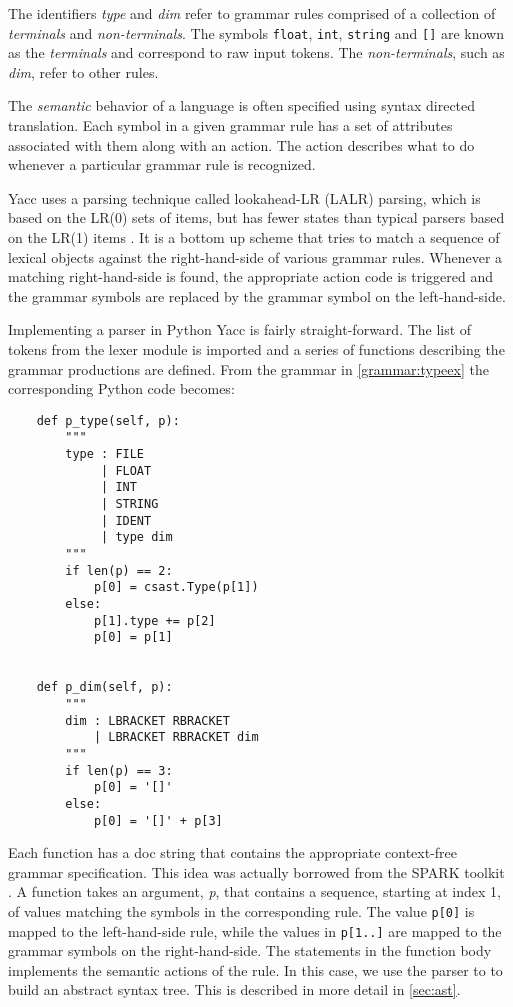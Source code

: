 \noindent The identifiers \emph{type} and \emph{dim} refer to grammar
rules comprised of a collection of \emph{terminals} and
\emph{non-terminals}. The symbols \texttt{float}, \texttt{int},
\texttt{string} and \texttt{[]} are known as the \emph{terminals}
and correspond to raw input tokens. The \emph{non-terminals}, such as
\emph{dim}, refer to other rules.

The \emph{semantic} behavior of a language is often specified using
syntax directed translation. Each symbol in a given grammar rule has a
set of attributes associated with them along with an action. The
action describes what to do whenever a particular grammar rule is
recognized.

Yacc uses a parsing technique called lookahead-LR (LALR) parsing,
which is based on the LR(0) sets of items, but has fewer states than
typical parsers based on the LR(1) items \citep{aho:2007}. It is a
bottom up scheme that tries to match a sequence of lexical objects
against the right-hand-side of various grammar rules. Whenever a
matching right-hand-side is found, the appropriate action code is
triggered and the grammar symbols are replaced by the grammar symbol
on the left-hand-side.

Implementing a parser in Python Yacc is fairly straight-forward. The
list of tokens from the lexer module is imported and a series of
functions describing the grammar productions are defined. From the
grammar in \autoref{grammar:typeex} the corresponding Python code
becomes:

\begin{lstlisting}
    def p_type(self, p):
        """
        type : FILE
             | FLOAT
             | INT
             | STRING
             | IDENT
             | type dim
        """
        if len(p) == 2:
            p[0] = csast.Type(p[1])
        else:
            p[1].type += p[2]
            p[0] = p[1]


    def p_dim(self, p):
        """
        dim : LBRACKET RBRACKET
            | LBRACKET RBRACKET dim
        """
        if len(p) == 3:
            p[0] = '[]'
        else:
            p[0] = '[]' + p[3]
\end{lstlisting}

Each function has a doc string that contains the appropriate
context-free grammar specification. This idea was actually borrowed
from the SPARK toolkit \citep{spark:online}. A function takes an
argument, \emph{p}, that contains a sequence, starting at index 1, of
values matching the symbols in the corresponding rule. The value
\texttt{p[0]} is mapped to the left-hand-side rule, while the values
in \texttt{p[1..]} are mapped to the grammar symbols on the
right-hand-side. The statements in the function body implements the
semantic actions of the rule. In this case, we use the parser to to
build an abstract syntax tree. This is described in more detail in
\autoref{sec:ast}.


